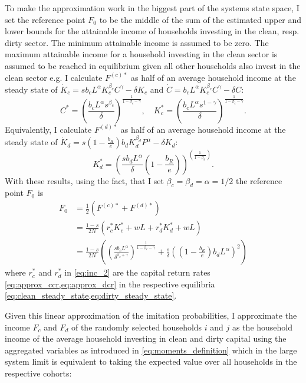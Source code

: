 To make the approximation work in the biggest part of the systems state space, I set the reference point $F_0$ to be the middle of the sum of the estimated upper and lower bounds for the attainable income of households investing in the clean, resp. dirty sector. The minimum attainable income is assumed to be zero. The maximum attainable income for a household investing in the clean sector is assumed to be reached in equilibrium given all other households also invest in the clean sector e.g. I calculate $F^{(c)*}$ as half of an average household income at the steady state of $\dot{K}_c = s b_c L^\alpha K_c^{\beta_c} C^\gamma - \delta K_c$ and $\dot{C} = b_c L^\alpha K_c^{\beta_c} C^\gamma - \delta C$:
\begin{equation}
	C^* = \left( \frac{b_c L^\alpha s^{\beta_c}}{\delta}\right)^{\frac{1}{1-\beta_c-\gamma}}, \quad K_c^* = \left( \frac{b_c L^\alpha s^{1-\gamma}}{\delta}\right)^{\frac{1}{1-\beta_c-\gamma}}.
	\label{eq:clean_steady_state}
\end{equation}
Equivalently, I calculate $F^{(d)*}$ as half of an average household income at the steady state of $ \dot{K}_d = s \left(1 - \frac{b_R}{e} \right) b_d K_d^{\beta_d} P^{\alpha} - \delta K_d $:
\begin{equation}
	K_d^* = \left( \frac{s b_d L^\alpha}{\delta} \left(1 - \frac{b_R}{e} \right)\right)^{\left(\frac{1}{1 - \beta_d} \right)}.
	\label{eq:dirty_steady_state}
\end{equation}
With these results, using the fact, that I set $\beta_c = \beta_d = \alpha = 1/2$ the reference point $F_0$ is
\begin{align}
	F_0 &= \frac{1}{2}\left(F^{(c)*} + F^{(d)*}  \right) \nonumber \\
	&= \frac{1-s}{2N}\left(r_c^* K_c^* + w L + r_d^* K_d^* + w L\right) \label{eq:inc_2}\\
	&= \frac{1-s}{2N}\left( \left( \frac{s b_c L^{\alpha}}{\delta^{\beta_c + \gamma}} \right)^{\frac{1}{1-\beta_c - \gamma}} + \frac{s}{\delta}\left( \left( 1 - \frac{b_R}{e} \right) b_d L^{\alpha} \right)^2 \right)
\end{align}
where $r_c^*$ and $r_d^*$ in \eqref{eq:inc_2} are the capital return rates \cref{eq:approx_ccr,eq:approx_dcr} in the respective equilibria \cref{eq:clean_steady_state,eq:dirty_steady_state}.

Given this linear approximation of the imitation probabilities, I approximate the income $F_c$ and $F_d$ of the randomly selected households $i$ and $j$ as the household income of the average household investing in clean and dirty capital using the aggregated variables as introduced in \eqref{eq:moments_definition} which in the large system limit is equivalent to taking the expected value over all households in the respective cohorts:

